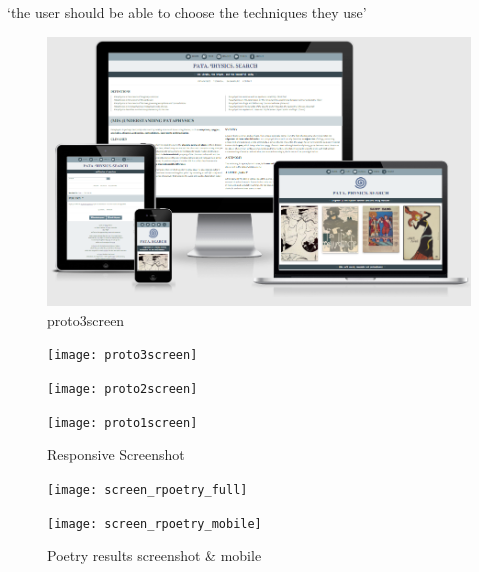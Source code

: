 `the user should be able to choose the techniques they use' \autocite{Hendler2011}


\begin{figure}[!htbp] %
  \centering
  \includegraphics[width=\linewidth]{images/proto3screen}
\caption[proto3screen]{proto3screen}
\label{img:proto3screen}
\end{figure}

\begin{figure}[!htbp]
  \centering
  \begin{minipage}{\linewidth}
    \texttt{[image: proto3screen]}
  \end{minipage}
  \hspace{.05\linewidth}
  \begin{minipage}{\linewidth}
    \texttt{[image: proto2screen]}
  \end{minipage}
  \hspace{.05\linewidth}
  \begin{minipage}{\linewidth}
    \texttt{[image: proto1screen]}
  \end{minipage}
  \caption[responsive screenshots]{Responsive Screenshot}
\label{Respscreenshots}
\end{figure}

\begin{figure}[!htbp]
  \centering
  \begin{minipage}{.57\linewidth}
    \texttt{[image: screen\_rpoetry\_full]}
  \end{minipage}
  \hspace{.05\linewidth}
  \begin{minipage}{.27\linewidth}
    \texttt{[image: screen\_rpoetry\_mobile]}
  \end{minipage}
  \caption[screenshots]{Poetry results screenshot \& mobile}
\label{screenshots}
\end{figure}

